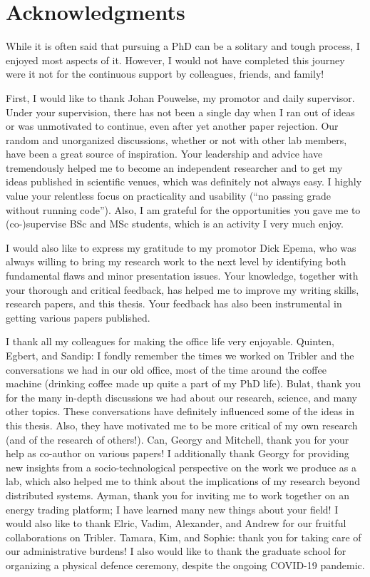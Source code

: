 \chapter*{Acknowledgments}

While it is often said that pursuing a PhD can be a solitary and tough process, I enjoyed most aspects of it.
However, I would not have completed this journey were it not for the continuous support by colleagues, friends, and family!

First, I would like to thank Johan Pouwelse, my promotor and daily supervisor.
Under your supervision, there has not been a single day when I ran out of ideas or was unmotivated to continue, even after yet another paper rejection.
Our random and unorganized discussions, whether or not with other lab members, have been a great source of inspiration.
Your leadership and advice have tremendously helped me to become an independent researcher and to get my ideas published in scientific venues, which was definitely not always easy.
I highly value your relentless focus on practicality and usability (\enquote{no passing grade without running code}).
Also, I am grateful for the opportunities you gave me to (co-)supervise BSc and MSc students, which is an activity I very much enjoy.

I would also like to express my gratitude to my promotor Dick Epema, who was always willing to bring my research work to the next level by identifying both fundamental flaws and minor presentation issues.
Your knowledge, together with your thorough and critical feedback, has helped me to improve my writing skills, research papers, and this thesis.
Your feedback has also been instrumental in getting various papers published.

I thank all my colleagues for making the office life very enjoyable.
Quinten, Egbert, and Sandip: I fondly remember the times we worked on Tribler and the conversations we had in our old office, most of the time around the coffee machine (drinking coffee made up quite a part of my PhD life\emojicoffee{}).
Bulat, thank you for the many in-depth discussions we had about our research, science, and many other topics.
These conversations have definitely influenced some of the ideas in this thesis. Also, they have motivated me to be more critical of my own research (and of the research of others!).
Can, Georgy and Mitchell, thank you for your help as co-author on various papers!
I additionally thank Georgy for providing new insights from a socio-technological perspective on the work we produce as a lab, which also helped me to think about the implications of my research beyond distributed systems.
Ayman, thank you for inviting me to work together on an energy trading platform; I have learned many new things about your field!
I would also like to thank Elric, Vadim, Alexander, and Andrew for our fruitful collaborations on Tribler.
Tamara, Kim, and Sophie: thank you for taking care of our administrative burdens!
I also would like to thank the graduate school for organizing a physical defence ceremony, despite the ongoing COVID-19 pandemic.

